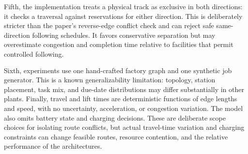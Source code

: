 Fifth, the implementation treats a physical track as exclusive in both
directions: it checks a traversal against reservations for either direction.
This is deliberately stricter than the paper's reverse-edge conflict check
and can reject safe same-direction following schedules. It favors
conservative separation but may overestimate congestion and completion time
relative to facilities that permit controlled following.

Sixth, experiments use one hand-crafted factory graph and one synthetic job
generator. This is a known generalizability limitation: topology, station
placement, task mix, and due-date distributions may differ substantially in
other plants. Finally, travel and lift times are deterministic functions of
edge lengths and speed, with no uncertainty, acceleration, or congestion
variation. The model also omits battery state and charging decisions. These
are deliberate scope choices for isolating route conflicts, but actual
travel-time variation and charging constraints can change feasible routes,
resource contention, and the relative performance of the architectures.

